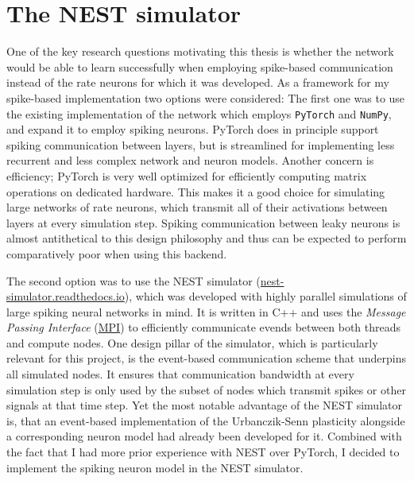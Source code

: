 \section{The NEST simulator}

One of the key research questions motivating this thesis is whether the network would be able to learn successfully when
employing spike-based communication instead of the rate neurons for which it was developed. As a framework for my
spike-based implementation two options were considered: The first one was to use the existing implementation of the
network which employs \texttt{PyTorch} and \texttt{NumPy}, and expand it to employ spiking neurons. PyTorch does in
principle support spiking communication between layers, but is streamlined for implementing less recurrent and less
complex network and neuron models. Another concern is efficiency; PyTorch is very well optimized for efficiently
computing matrix operations on dedicated hardware. This makes it a good choice for simulating large networks of rate
neurons, which transmit all of their activations between layers at every simulation step. Spiking communication between
leaky neurons is almost antithetical to this design philosophy and thus can be expected to perform comparatively poor
when using this backend.

The second option was to use the NEST simulator
(\href{https://nest-simulator.readthedocs.io}{nest-simulator.readthedocs.io}), which was developed with highly parallel
simulations of large spiking neural networks in mind. It is written in C++ and uses the \textit{Message Passing
Interface} (\href{https://www.mpi-forum.org/}{MPI}) to efficiently communicate evends between both threads and compute
nodes. One design pillar of the simulator, which is particularly relevant for this project, is the event-based
communication scheme that underpins all simulated nodes. It ensures that communication bandwidth at every simulation
step is only used by the subset of nodes which transmit spikes or other signals at that time step. Yet the most notable
advantage of the NEST simulator is, that an event-based implementation of the Urbanczik-Senn plasticity alongside a
corresponding neuron model had already been developed for it. Combined with the fact that I had more prior experience
with NEST over PyTorch, I decided to implement the spiking neuron model in the NEST simulator.

